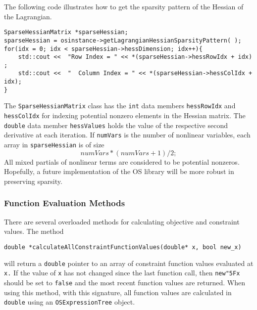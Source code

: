 \documentclass[11pt]{article}
\renewcommand{\_}{{\char"5F}}
\renewcommand{\{}{{\char"7B}}
\renewcommand{\}}{{\char"7D}}
\renewcommand{\^}{{\char"0D}}
\renewcommand{\'}{{\char"0D}}
\begin{document}
The following code illustrates how to get the sparsity pattern of the Hessian of the Lagrangian.
\begin{verbatim}
SparseHessianMatrix *sparseHessian;
sparseHessian = osinstance->getLagrangianHessianSparsityPattern( );
for(idx = 0; idx < sparseHessian->hessDimension; idx++){
	std::cout <<  "Row Index = " << *(sparseHessian->hessRowIdx + idx) ;
	std::cout <<  "  Column Index = " << *(sparseHessian->hessColIdx + idx);
}
\end{verbatim}
The {\tt SparseHessianMatrix} class has the {\tt int} data members {\tt hessRowIdx} and {\tt hessColIdx} for indexing  potential nonzero elements in the Hessian matrix. The {\tt double} data member {\tt hessValues} holds the value of the respective second derivative at each iteration.  If {\tt numVars} is the number of nonlinear variables, each array in {\tt sparseHessian} is of size 
$$
numVars*(numVars + 1)/2;
$$
All mixed partials of nonlinear terms are considered to be potential nonzeros.  Hopefully, a future implementation of the OS library will be more robust in preserving sparsity. 


\subsubsection{Function Evaluation Methods}

There are several overloaded methods for calculating objective and constraint values.  The method
\begin{verbatim}
double *calculateAllConstraintFunctionValues(double* x, bool new_x)
\end{verbatim}
will return a {\tt double} pointer to an array of constraint function values evaluated at {\tt x.}  If the value of {\tt x} has not changed since the last function call, then {\tt new\_x} should be set to {\tt false} and the most recent function values are returned.  When using this method, with this signature,  all function values are calculated in {\tt double} using an {\tt OSExpressionTree} object. 
\end{document}
